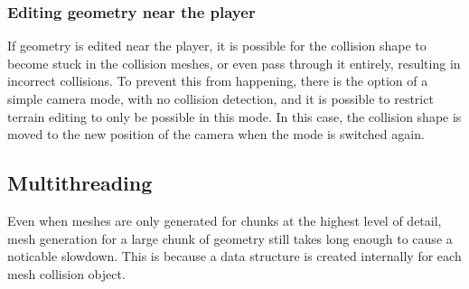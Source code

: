 \documentclass[11pt]{article}
\begin{document}
\subsubsection{Editing geometry near the player}
If geometry is edited near the player, it is possible for the collision shape to become stuck in the collision meshes, or even pass through it entirely, resulting in incorrect collisions. To prevent this from happening, there is the option of a simple camera mode, with no collision detection, and it is possible to restrict terrain editing to only be possible in this mode. In this case, the collision shape is moved to the new position of the camera when the mode is switched again.
\subsection{Multithreading}
\label{section:multithreading}
Even when meshes are only generated for chunks at the highest level of detail, mesh generation for a large chunk of geometry still takes long enough to cause a noticable slowdown. This is because a data structure is created internally for each mesh collision object.
\end{document}
